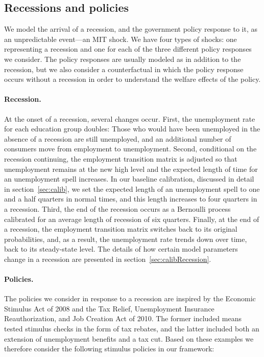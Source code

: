 \documentclass[\latexroot/\projectname]{subfiles}
\begin{document}
\subsection{Recessions and policies}\whenintegrated{\label{recessions-and-policies}}
\whenintegrated{\label{sec:recessions}} 
We model the arrival of a recession, and the government policy response to it, as an unpredictable event---an MIT shock.
We have four types of shocks: one representing a recession and one for each of the three different policy responses we consider.
The policy responses are usually modeled as in addition to the recession, but we also consider a counterfactual in which the policy response occurs without a recession in order to understand the welfare effects of the policy.

\paragraph{Recession.} At the onset of a recession, several changes occur.
First, the unemployment rate for each education group doubles: Those who would have been unemployed in the absence of a recession are still unemployed, and an additional number of consumers move from employment to unemployment.
Second, conditional on the recession continuing, the employment transition matrix is adjusted so that unemployment remains at the new high level and the expected length of time for an unemployment spell increases. In our baseline calibration, discussed in detail in section~\ref{sec:calib}, we set the expected length of an unemployment spell to one and a half quarters in normal times, and this length increases to four quarters in a recession.
Third, the end of the recession occurs as a Bernoulli process calibrated for an average length of recession of six quarters.
Finally, at the end of a recession, the employment transition matrix switches back to its original probabilities, and, as a result, the unemployment rate trends down over time, back to its steady-state level. The details of how certain model parameters change in a recession are presented in section~\ref{sec:calibRecession}.

\paragraph{Policies.} The policies we consider in response to a recession are inspired by the Economic Stimulus Act of 2008 and the Tax Relief, Unemployment Insurance Reauthorization, and Job Creation Act of 2010.
The former included means tested stimulus checks in the form of tax rebates, and the latter included both an extension of unemployment benefits and a tax cut.
Based on these examples we therefore consider the following stimulus policies in our framework:
\end{document}
